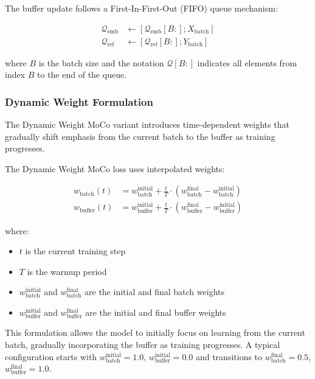 The buffer update follows a First-In-First-Out (FIFO) queue mechanism:

\begin{align}
  \mathcal{Q}_{\text{emb}} &\leftarrow [\mathcal{Q}_{\text{emb}}[B:]; X_{\text{batch}}]\\
  \mathcal{Q}_{\text{ref}} &\leftarrow [\mathcal{Q}_{\text{ref}}[B:]; Y_{\text{batch}}]
\end{align}

where $B$ is the batch size and the notation $\mathcal{Q}[B:]$ indicates all elements from index $B$ to the end of the queue.

\subsubsection{Dynamic Weight Formulation}

The Dynamic Weight MoCo variant introduces time-dependent weights that gradually shift emphasis from the current batch to the buffer as training progresses.

\begin{equationbox}[title=Dynamic Weight MoCo Loss]
  The Dynamic Weight MoCo loss uses interpolated weights:
  
  \begin{align}
    w_{\text{batch}}(t) &= w_{\text{batch}}^{\text{initial}} + \frac{t}{T} \cdot (w_{\text{batch}}^{\text{final}} - w_{\text{batch}}^{\text{initial}})\\
    w_{\text{buffer}}(t) &= w_{\text{buffer}}^{\text{initial}} + \frac{t}{T} \cdot (w_{\text{buffer}}^{\text{final}} - w_{\text{buffer}}^{\text{initial}})
  \end{align}
  
  where:
  \begin{itemize}
  \item $t$ is the current training step
  \item $T$ is the warmup period
  \item $w_{\text{batch}}^{\text{initial}}$ and $w_{\text{batch}}^{\text{final}}$ are the initial and final batch weights
  \item $w_{\text{buffer}}^{\text{initial}}$ and $w_{\text{buffer}}^{\text{final}}$ are the initial and final buffer weights
  \end{itemize}
\end{equationbox}

This formulation allows the model to initially focus on learning from the current batch, gradually incorporating the buffer as training progresses. A typical configuration starts with $w_{\text{batch}}^{\text{initial}} = 1.0$, $w_{\text{buffer}}^{\text{initial}} = 0.0$ and transitions to $w_{\text{batch}}^{\text{final}} = 0.5$, $w_{\text{buffer}}^{\text{final}} = 1.0$.


